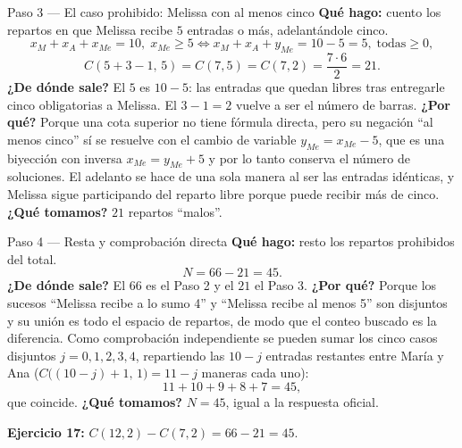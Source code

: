 \documentclass[11pt]{article}
\begin{document}
\begin{paso}{Paso 3 --- El caso prohibido: Melissa con al menos cinco}
\textbf{Qué hago:} cuento los repartos en que Melissa recibe $5$ entradas o más, adelantándole cinco.
\[
x_M+x_A+x_{Me}=10,\;x_{Me}\ge5\iff x_M+x_A+y_{Me}=10-5=5,\;\text{todas}\ge0,
\]
\[
C(5+3-1,\,5)=C(7,5)=C(7,2)=\frac{7\cdot 6}{2}=21 .
\]
\textbf{¿De dónde sale?} El $5$ es $10-5$: las entradas que quedan libres tras entregarle cinco obligatorias a Melissa. El $3-1=2$ vuelve a ser el número de barras.
\textbf{¿Por qué?} Porque una cota superior no tiene fórmula directa, pero su negación ``al menos cinco'' sí se resuelve con el cambio de variable $y_{Me}=x_{Me}-5$, que es una biyección con inversa $x_{Me}=y_{Me}+5$ y por lo tanto conserva el número de soluciones. El adelanto se hace de una sola manera al ser las entradas idénticas, y Melissa sigue participando del reparto libre porque puede recibir más de cinco.
\textbf{¿Qué tomamos?} $21$ repartos ``malos''.
\end{paso}

\begin{paso}{Paso 4 --- Resta y comprobación directa}
\textbf{Qué hago:} resto los repartos prohibidos del total.
\[
N=66-21=45 .
\]
\textbf{¿De dónde sale?} El $66$ es el Paso 2 y el $21$ el Paso 3.
\textbf{¿Por qué?} Porque los sucesos ``Melissa recibe a lo sumo 4'' y ``Melissa recibe al menos 5'' son disjuntos y su unión es todo el espacio de repartos, de modo que el conteo buscado es la diferencia. Como comprobación independiente se pueden sumar los cinco casos disjuntos $j=0,1,2,3,4$, repartiendo las $10-j$ entradas restantes entre María y Ana ($C\bigl((10-j)+1,\,1\bigr)=11-j$ maneras cada uno):
\[
11+10+9+8+7=45 ,
\]
que coincide.
\textbf{¿Qué tomamos?} $N=45$, igual a la respuesta oficial.
\end{paso}

\begin{resp}
\textbf{Ejercicio 17:} $C(12,2)-C(7,2)=66-21=45$.
\end{resp}
\end{document}
